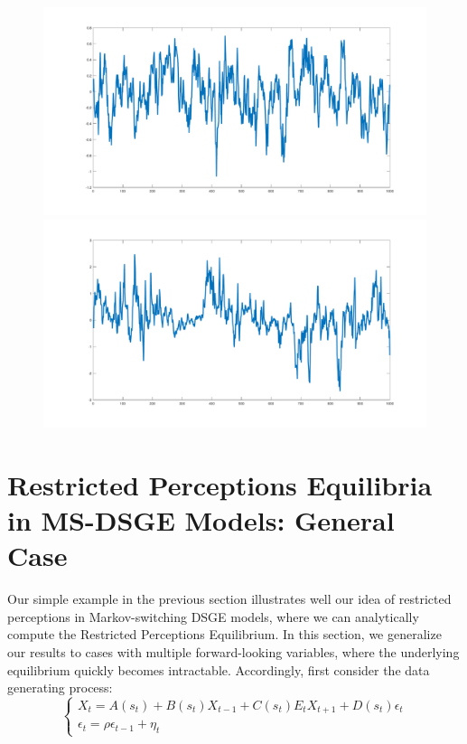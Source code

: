 \documentclass[12pt,reqno]{article}
\numberwithin{equation}{section}
\begin{document}
\begin{figure}[H]
\includegraphics[scale=0.2]{fisher_simulation1_pinf.pdf} 
\includegraphics[scale=0.2]{fisher_simulation2_pinf.pdf} \\
\end{figure}

\section{Restricted Perceptions Equilibria in MS-DSGE Models: General Case}

Our simple example in the previous section illustrates well our idea of restricted perceptions in Markov-switching DSGE models, where we can analytically compute the Restricted Perceptions Equilibrium. In this section, we generalize our results to cases with multiple forward-looking variables, where the underlying equilibrium quickly becomes intractable. Accordingly, first consider the data generating process: \\

$$
\begin{cases}
X_t = A(s_t) + B(s_t) X_{t-1} + C(s_t) E_t X_{t+1} + D(s_t) \epsilon_t \\
\epsilon_t = \rho \epsilon_{t-1} + \eta_t 
\end{cases}
$$
\end{document}
